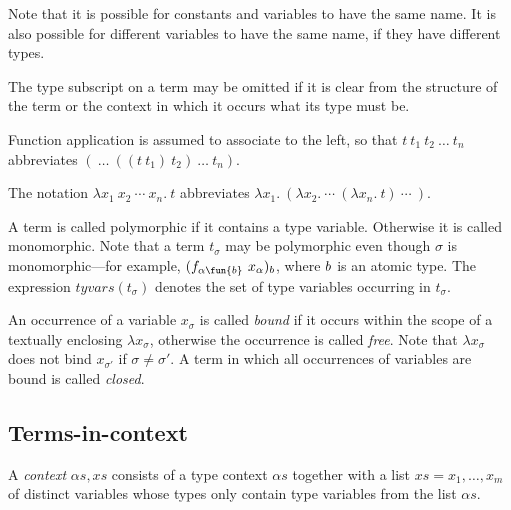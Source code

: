 Note that it is possible for constants and variables to have the
same name.  It is also possible for different variables to have the
same name, if they have different types. 

The type subscript on a term may be omitted if it is clear from the
structure of the term or the context in which it occurs what its type
must be.

Function application is assumed to associate
to the left, so that $t\ t_1\ t_2\ \ldots\ t_n$ abbreviates $(\
\ldots\ ((t\ t_1)\ t_2)\ \ldots\ t_n)$.  

The notation $\lambda x_1\ x_2\ \cdots\ x_n.\ t$ abbreviates $\lambda
x_1.\ (\lambda x_2.\ \cdots\ (\lambda x_n.\ t)\ \cdots\ )$.

A term is called polymorphic if it contains a type
variable. Otherwise it is called monomorphic. Note that a term
$t_{\sigma}$ may be polymorphic even though $\sigma$ is
monomorphic---for example, $(f_{\alpha\fun{\sl b}}\ x_{\alpha})_{\sl
b}$, where $\sl b$ is an atomic type. The expression
$tyvars(t_{\sigma})$ denotes the set of type variables occurring in
$t_{\sigma}$.

An occurrence of a variable $x_{\sigma}$ is called {\it
bound\/}
 if it occurs within the scope of a textually enclosing
$\lambda x_{\sigma}$, otherwise the occurrence is called {\it
free\/}. Note that $\lambda x_{\sigma}$ does not bind
$x_{\sigma'}$ if $\sigma\neq \sigma'$.  A term in which all occurrences
of variables are bound is called {\it closed\/}. 

\subsection{Terms-in-context}
\label{terms-in-context}

A {\em context\/} $\alpha\!s,\!x\!s$ consists of a type
context $\alpha\!s$ together with a list $x\!s=x_{1},\ldots,x_{m}$ of
distinct variables whose types only contain type variables from the
list $\alpha\!s$.

